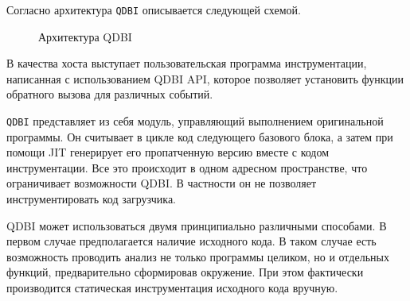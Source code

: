 Согласно \cite{QDBI} архитектура \texttt{QDBI} описывается следующей схемой.
\begin{figure}[H]
    \caption{Архитектура QDBI}
    \label{fig:qdbi}
\end{figure}

В качества хоста выступает пользовательская программа инструментации, написанная с использованием QDBI API, которое позволяет установить функции обратного вызова для различных событий.

\texttt{QDBI} представляет из себя модуль, управляющий выполнением оригинальной программы. Он считывает в цикле код следующего базового блока, а затем при помощи JIT генерирует его пропатченную версию вместе с кодом инструментации. Все это происходит в одном адресном пространстве, что ограничивает возможности QDBI. В частности он не позволяет инструментировать код загрузчика.

QDBI может использоваться двумя принципиально различными способами. В первом случае предполагается наличие исходного кода. В таком случае есть возможность проводить анализ не только программы целиком, но и отдельных функций, предварительно сформировав окружение. При этом фактически производится статическая инструментация исходного кода вручную.

